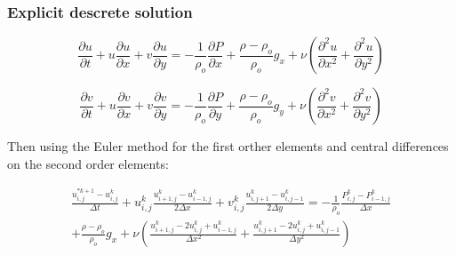 \documentclass[xcolor=dvipsnames,10pt,aspectratio=169]{beamer}
\begin{document}
\begin{frame}
	\frametitle{Explicit descrete solution}
	\centering
	\begin{equation}
		\frac{\partial u}{\partial t} + u\frac{\partial u}{\partial x} + v\frac{\partial u}{\partial y} =  -\frac{1}{\rho_o} \frac{\partial P}{\partial x} + \frac{\rho - 	\rho_o}{\rho_o} g_x + \nu \left( \frac{\partial ^2 u}{\partial x^2} + \frac{\partial ^2 u}{\partial y^2} \right)
	\end{equation}

	\begin{equation}
		\frac{\partial v}{\partial t} + u\frac{\partial v}{\partial x} + v\frac{\partial v}{\partial y} =  -\frac{1}{\rho_o} \frac{\partial P}{\partial y} + \frac{\rho - \rho_o}{\rho_o} g_y + \nu \left( \frac{\partial ^2 v}{\partial x^2} + \frac{\partial ^2 v}{\partial y^2} \right)
	\end{equation}

	Then using the Euler method for the first orther elements and central differences on the second order elements:

	\begin{equation}
		\begin{split}
		\frac{u_{i , j}^{\ast k + 1} - u_{i , j}^{k}}{\Delta t} + u_{i , j}^{k}\frac{u_{i + 1 , j}^k - u_{i - 1 , j}^k  }{2 \Delta x} + v_{i , j}^{k}\frac{u_{i , j+ 1}^k - u_{i, j-1}^k  }{2 \Delta y} =  -\frac{1}{\rho_o} \frac{P_{i, j}^k - P_{i - 1, j}^k}{\Delta x} \\ + \frac{\rho - 	\rho_o}{\rho_o} g_x + \nu \left( \frac{u_{i+1 , j}^{k} - 2 u_{i,j}^{k} + u_{i-1,j}^{k}}{\Delta x^2} + \frac{u_{i , j+1}^{k} - 2 u_{i,j}^{k} + u_{i,j-1}^{ k}}{\Delta y^2} \right)
		\end{split}
	\end{equation}
\end{frame}
\end{document}
